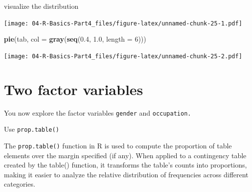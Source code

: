 \documentclass[
]{book}
\newenvironment{Shaded}{\begin{snugshade}}{\end{snugshade}}
\newcommand{\AttributeTok}[1]{\textcolor[rgb]{0.13,0.29,0.53}{#1}}
\newcommand{\CommentTok}[1]{\textcolor[rgb]{0.56,0.35,0.01}{\textit{#1}}}
\newcommand{\DecValTok}[1]{\textcolor[rgb]{0.00,0.00,0.81}{#1}}
\newcommand{\FloatTok}[1]{\textcolor[rgb]{0.00,0.00,0.81}{#1}}
\newcommand{\FunctionTok}[1]{\textcolor[rgb]{0.13,0.29,0.53}{\textbf{#1}}}
\newcommand{\NormalTok}[1]{#1}
\newcommand{\OtherTok}[1]{\textcolor[rgb]{0.56,0.35,0.01}{#1}}
\newcommand{\SpecialCharTok}[1]{\textcolor[rgb]{0.81,0.36,0.00}{\textbf{#1}}}
\begin{document}
visualize the distribution

\begin{Shaded}
\end{Shaded}

\texttt{[image: 04-R-Basics-Part4\_files/figure-latex/unnamed-chunk-25-1.pdf]}

\begin{Shaded}
\begin{Highlighting}[]
\FunctionTok{pie}\NormalTok{(tab, }\AttributeTok{col =} \FunctionTok{gray}\NormalTok{(}\FunctionTok{seq}\NormalTok{(}\FloatTok{0.4}\NormalTok{, }\FloatTok{1.0}\NormalTok{, }\AttributeTok{length =} \DecValTok{6}\NormalTok{)))}
\end{Highlighting}
\end{Shaded}

\texttt{[image: 04-R-Basics-Part4\_files/figure-latex/unnamed-chunk-25-2.pdf]}

\section*{Two factor variables}\label{two-factor-variables}

You now explore the factor variables \texttt{gender} and \texttt{occupation.}

Use \texttt{prop.table()}

The \texttt{prop.table()} function in R is used to compute the proportion of table elements over the margin specified (if any). When applied to a contingency table created by the table() function, it transforms the table's counts into proportions, making it easier to analyze the relative distribution of frequencies across different categories.

\begin{Shaded}
\end{Shaded}
\end{document}
